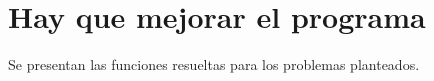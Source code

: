 \section{Hay que mejorar el programa}

  Se presentan las funciones resueltas para los problemas planteados. 
  
  
